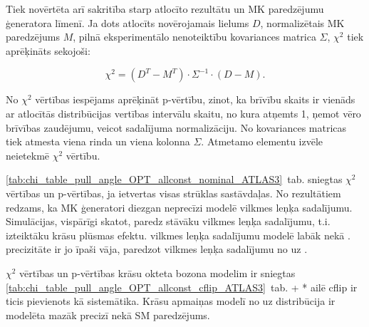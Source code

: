 Tiek novērtēta arī sakritība starp atlocīto rezultātu un MK paredzējumu ģeneratora līmenī. Ja dots atlocīts novērojamais lielums $D$, normalizētais MK paredzējums $M$, pilnā eksperimentālo nenoteiktību kovariances matrica $\Sigma$, $\chi^{2}$ tiek aprēķināts sekojoši:

\begin{equation}
  \chi^{2}=(D^{T}-M^{T})\cdot\Sigma^{-1}\cdot(D-M).
  \label{eq:chi2}
\end{equation}

No $\chi^{2}$ vērtības iespējams aprēķināt p-vērtību, zinot, ka brīvību skaits ir vienāds ar atlocītās distribūcijas vertības intervālu skaitu, no kura atņemts 1, ņemot vēro brīvības zaudējumu, veicot sadalījuma normalizāciju. No kovariances matricas tiek atmesta viena rinda un viena kolonna $\Sigma$. Atmetamo elementu izvēle neietekmē $\chi^{2}$ vērtību.

\ref{tab:chi_table_pull_angle_OPT_allconst_nominal_ATLAS3}~tab. sniegtas \pullangle $\chi^{2}$ vērtības un p-vērtības, ja ietvertas visas strūklas sastāvdaļas. No rezultātiem redzams, ka MK ģeneratori diezgan neprecīzi modelē vilkmes leņķa sadalījumu. Simulācijas, vispārīgi skatot, paredz stāvāku vilkmes leņķa sadalījumu, t.i. izteiktāku krāsu plūsmas efektu. \HERWIGpp vilkmes leņķa sadalījumu modelē labāk nekā .  precizitāte ir jo īpaši vāja, paredzot vilkmes leņķa sadalījumu no \scndleadingjet uz \leadingjet.

$\chi^{2}$ vērtības un p-vērtības krāsu okteta \PW bozona modelim ir sniegtas \ref{tab:chi_table_pull_angle_OPT_allconst_cflip_ATLAS3}~tab. \POWHEG+ * ailē \ttbar cflip ir ticis pievienots kā \ttbar sistemātika. Krāsu apmaiņas modelī \pullangle no \leadingjet uz \scndleadingjet distribūcija ir modelēta mazāk precizī nekā SM paredzējums. 
  







%
